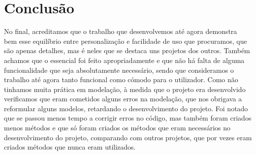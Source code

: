 \documentclass[10pt, a4paper]{article}
\begin{document}
\section{Conclusão}\label{analise}
No final, acreditamos que o trabalho que desenvolvemos até agora demonstra bem esse equilíbrio entre personalização e facilidade de uso que procuramos, que são apenas detalhes, mas é neles que se destaca uns projetos dos outros. Também achamos que o essencial foi feito apropriadamente e que não há falta de alguma funcionalidade que seja absolutamente necessário, sendo que consideramos o trabalho até agora tanto funcional como cómodo para o utilizador. Como não tinhamos muita prática em modelação, à medida que o projeto era desenvolvido verificamos que eram cometidos alguns erros na modelação, que nos obrigava a reformular alguns modelos, retardando o desenvolvimento do projeto. Foi notado que se passou menos tempo a corrigir erros no código, mas também foram criados menos métodos e que só foram criados os métodos que eram necessários no desenvolvimento do projeto, comparando com outros projetos, que por vezes eram criados métodos que nunca eram utilizados.
\end{document}
